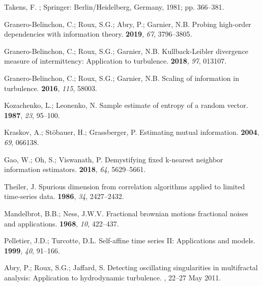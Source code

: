 \documentclass[aps,pra,groupedaddress,notitlepage]{revtex4-1}
\begin{document}
\begin{thebibliography}{999}
Takens, F.
;
\newblock Springer: Berlin/Heidelberg, Germany,   1981;  pp.  366--381.

Granero-Belinchon, C.; Roux, S.G.; Abry, P.; Garnier, N.B.
\newblock Probing high-order dependencies with information theory.
    \textbf{2019},  \emph{67},   3796--3805.


Granero-Belinchon, C.; Roux, S.G.; Garnier, N.B.
\newblock Kullback-{L}eibler divergence measure of intermittency: {A}pplication
  to turbulence.
  \textbf{2018}, \emph{97},  013107.

Granero-Belinchon, C.; Roux, S.G.; Garnier, N.B.
\newblock Scaling of information in turbulence.
  \textbf{2016}, \emph{115},  58003.

Kozachenko, L.; Leonenko, N.
\newblock Sample estimate of entropy of a random vector.
  \textbf{1987}, \emph{23},  95--100.

Kraskov, A.; St\"obauer, H.; Grassberger, P.
\newblock Estimating mutual information.
  \textbf{2004}, \emph{69},  066138.

Gao, W.; Oh, S.; Viswanath, P.
\newblock Demystifying fixed k-nearest neighbor information estimators.
 \textbf{2018}, \emph{64},  5629--5661.
 

Theiler, J.
\newblock Spurious dimension from correlation algorithms applied to limited
  time-series data.
  \textbf{1986}, \emph{34},  2427--2432.

Mandelbrot, B.B.; Ness, J.W.V.
\newblock Fractional brownian motions fractional noises and applications.
  \textbf{1968}, \emph{10},  422--437.

Pelletier, J.D.; Turcotte, D.L.
\newblock Self-affine time series {II}: {A}pplications and models.
  \textbf{1999}, \emph{40},  91--166.

Abry, P.; Roux, S.G.; Jaffard, S.
\newblock Detecting oscillating singularities in multifractal analysis:
  Application to hydrodynamic turbulence.
,  22--27 May  2011.


\end{thebibliography}
\end{document}
